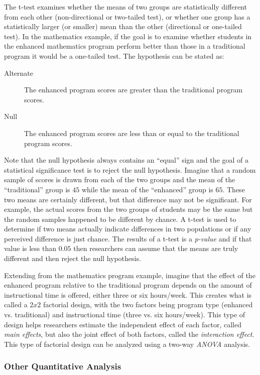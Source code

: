 The t-test examines whether the means of two groups are statistically different from each other (non-directional or two-tailed test), or whether one group has a statistically larger (or smaller) mean than the other (directional or one-tailed test). In the mathematics example, if the goal is to examine whether students in the enhanced mathematics program perform better than those in a traditional program it would be a one-tailed test. The hypothesis can be stated as:

\begin{description}
	\item[Alternate] The enhanced program scores are greater than the traditional program scores.
	\item[Null] The enhanced program scores are less than or equal to the traditional program scores.
\end{description}

Note that the null hypothesis always contains an ``equal'' sign and the goal of a statistical significance test is to reject the null hypothesis. Imagine that a random sample of scores is drawn from each of the two groups and the mean of the ``traditional'' group is $ 45 $ while the mean of the ``enhanced'' group is $ 65 $. These two means are certainly different, but that difference may not be significant. For example, the actual scores from the two groups of students may be the same but the random samples happened to be different by chance. A t-test is used to determine if two means actually indicate differences in two populations or if any perceived difference is just chance. The results of a t-test is a \textit{p-value} and if that value is less than $ 0.05 $ then researchers can assume that the means are truly different and then reject the null hypothesis.

Extending from the mathematics program example, imagine that the effect of the enhanced program relative to the traditional program depends on the amount of instructional time is offered, either three or six hours/week. This creates what is called a $ 2 x 2 $ factorial design, with the two factors being program type (enhanced vs. traditional) and instructional time (three vs. six hours/week). This type of design helps researchers estimate the independent effect of each factor, called \textit{main effects}, but also the joint effect of both factors, called the \textit{interaction effect}. This type of factorial design can be analyzed using a two-way \textit{ANOVA} analysis. 

\subsubsection{Other Quantitative Analysis}

